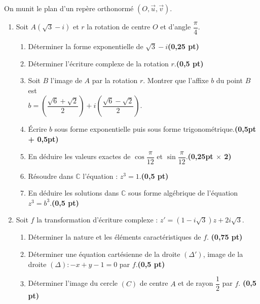 \documentclass[12pt,a4paper]{article}
\begin{document}
On munit le plan d'un repère orthonormé $\left(O, \vec{u}, \vec{v}\right)$.
\begin{enumerate}
    \item Soit $A(\sqrt{3} - i)$ et $r$ la rotation de centre $O$ et d'angle $\dfrac{\pi}{4}$.
    \begin{enumerate}
        \item Déterminer la forme exponentielle de $\sqrt{3} - i$\hfill \textbf{(0,25 pt)}
        \item Déterminer l'écriture complexe de la rotation $r$.\hfill \textbf{(0,5 pt)}
        \item Soit $B$ l'image de $A$ par la rotation $r$. Montrer que l'affixe $b$ du point $B$ est \\$b = \left(\dfrac{\sqrt{6}+\sqrt{2}}{2}\right) + i \left(\dfrac{\sqrt{6}-\sqrt{2}}{2}\right)$.
        \item Écrire $b$ sous forme exponentielle puis sous forme trigonométrique.\hfill \textbf{(0,5pt + 0,5pt)} 
        \item En déduire les valeurs exactes de $\cos \dfrac{\pi}{12}$ et $\sin \dfrac{\pi}{12}$.\hfill \textbf{(0,25pt $\times$ 2)}
        \item Résoudre dans $\mathbb{C}$ l'équation : $z^3 = 1$.\hfill \textbf{(0,5 pt)}
        \item En déduire les solutions dans $\mathbb{C}$ sous forme algébrique de l'équation $z^3 = b^3$.\hfill \textbf{(0,5 pt)}
    \end{enumerate}
    \item Soit $f$ la transformation d'écriture complexe : $z' = \left(1 - i\sqrt{3}\right)z + 2i\sqrt{3}$.
    \begin{enumerate}
        \item Déterminer la nature et les éléments caractéristiques de $f$. \hfill \textbf{(0,75 pt)}
        \item Déterminer une équation cartésienne de la droite $(\Delta')$, image de la droite $(\Delta) : -x + y - 1 = 0$ par $f$.\hfill \textbf{(0,5 pt)}
        \item Déterminer l'image du cercle $(C)$ de centre $A$ et de rayon $\dfrac{1}{2}$ par $f$. \hfill \textbf{(0,5 pt)}
    \end{enumerate}
\end{enumerate}
\end{document}
